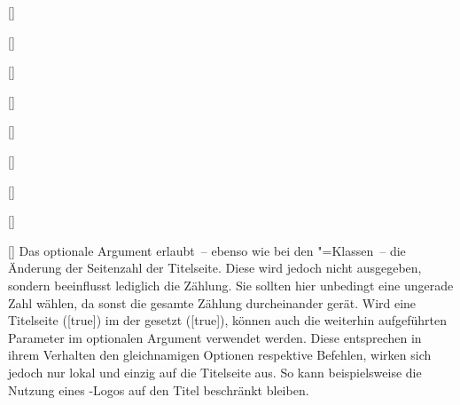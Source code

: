 \begin{Declaration}
\begin{Declaration}[v2.02]{%
  []%
}
\begin{Declaration}[v2.02]{[\PSet]}{%
}
\begin{Declaration}[v2.03]{[\PSet]}{%
}
\begin{Declaration}[v2.03]{[\PSet]}{%
}
\begin{Declaration}[v2.03]{%
  []%
}{}
\begin{Declaration}[v2.03]{%
  []
}{}
\begin{Declaration}[v2.03]{[\PSet]}{%
}
\begin{Declaration}[v2.03]{[\PSet]}{%
}
\begin{Declaration}[v2.03]{[\PSet]}{%
}
Das optionale Argument erlaubt~-- ebenso wie bei den \KOMAScript"=Klassen~-- 
die Änderung der Seitenzahl der Titelseite. Diese wird jedoch nicht ausgegeben, 
sondern beeinflusst lediglich die Zählung. Sie sollten hier unbedingt eine 
ungerade Zahl wählen, da sonst die gesamte Zählung durcheinander gerät. 
Wird eine Titelseite ([true]) im \CD der \TnUD gesetzt 
([true]), können auch die weiterhin aufgeführten Parameter im 
optionalen Argument verwendet werden. Diese entsprechen in ihrem Verhalten den 
gleichnamigen Optionen respektive Befehlen, wirken sich jedoch nur lokal und 
einzig auf die Titelseite aus. So kann beispielsweise die Nutzung eines 
\DDC-Logos auf den Titel beschränkt bleiben.
\end{Declaration}
\end{Declaration}
\end{Declaration}
\end{Declaration}
\end{Declaration}
\end{Declaration}
\end{Declaration}
\end{Declaration}
\end{Declaration}
\end{Declaration}

